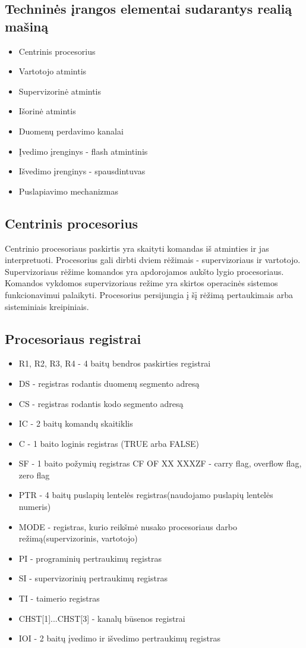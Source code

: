 \documentclass[oneside]{VUMIFPSkursinis}
\begin{document}
\subsection{Techninės įrangos elementai sudarantys realią mašiną}
\begin{itemize}
	\item{Centrinis procesorius}
	\item{Vartotojo atmintis}
	\item{Supervizorinė atmintis}
	\item{Išorinė atmintis}
	\item{Duomenų perdavimo kanalai}
	\item{Įvedimo įrenginys - flash atmintinis}
	\item{Išvedimo įrenginys - spausdintuvas}
	\item{Puslapiavimo mechanizmas}
\end{itemize}

\subsection{Centrinis procesorius}
	Centrinio procesoriaus paskirtis yra skaityti komandas iš atminties ir jas interpretuoti. Procesorius gali dirbti dviem rėžimais - supervizoriaus ir vartotojo. Supervizoriaus rėžime komandos yra apdorojamos aukšto lygio procesoriaus. Komandos vykdomos supervizoriaus režime yra skirtos operacinės sistemos funkcionavimui palaikyti. Procesorius persijungia į šį rėžimą pertaukimais arba sisteminiais kreipiniais.
\subsection{Procesoriaus registrai}
\begin{itemize}
	\item{R1, R2, R3, R4 - 4 baitų bendros paskirties registrai}
	\item{DS - registras rodantis duomenų segmento adresą}
	\item{CS - registras rodantis kodo segmento adresą}
	\item{IC - 2 baitų komandų skaitiklis}
	\item{C - 1 baito loginis registras (TRUE arba FALSE)}
	\item{SF - 1 baito požymių registras CF OF XX XXXZF - carry flag, overflow flag, zero flag}
	\item{PTR - 4 baitų puslapių lentelės registras(naudojamo puslapių lentelės numeris)}
	\item{MODE - registras, kurio reikšmė nusako procesoriaus darbo režimą(supervizorinis, vartotojo)}
	\item{PI - programinių pertraukimų registras}
	\item{SI - supervizorinių pertraukimų registras}
	\item{TI - taimerio registras}
	\item{CHST[1]...CHST[3] - kanalų būsenos registrai }
	\item{IOI - 2 baitų įvedimo ir išvedimo pertraukimų registras}
\end{itemize}
\end{document}
